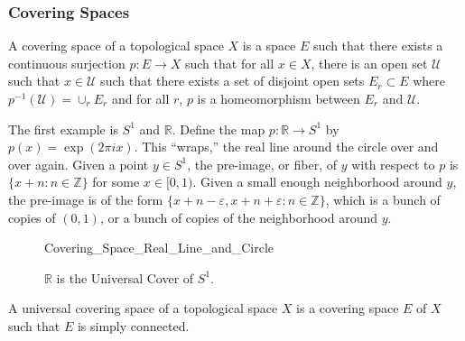 \documentclass[crop=false,class=book,oneside]{standalone}                      %
\begin{document}
        \subsubsection{Covering Spaces}
            \begin{definition}
                A covering space of a
                topological space $X$
                is a space
                $E$ such that there exists
                a continuous surjection
                $p:E\rightarrow{X}$ such that
                for all $x\in{X}$, there is an
                open set $\mathcal{U}$ such that
                $x\in\mathcal{U}$ such that there
                exists a set of disjoint open sets
                $E_{r}\subset{E}$ where
                $p^{-1}(\mathcal{U})=\cup_{r}E_{r}$
                and for all $r$,
                $p$ is a homeomorphism between
                $E_{r}$ and $\mathcal{U}$.
            \end{definition}
            \begin{example}
                The first example is
                $S^{1}$ and $\mathbb{R}$.
                Define the map
                $p:\mathbb{R}\rightarrow{S^{1}}$
                by $p(x)=\exp(2\pi{i}x)$. This ``wraps,''
                the real line around the circle over and over again.
                Given a point $y\in{S^{1}}$, the pre-image, or fiber,
                of $y$ with respect to $p$ is
                $\{x+n:n\in\mathbb{Z}\}$ for some $x\in[0,1)$.
                Given a small enough neighborhood
                around $y$, the pre-image is of the form
                $\{x+n-\varepsilon,x+n+\varepsilon:n\in\mathbb{Z}\}$,
                which is a bunch of copies of $(0,1)$, or a bunch
                of copies of the neighborhood around $y$.
            \end{example}
            \begin{figure}[H]
                \centering
                \captionsetup{type=figure}
                
                          {Covering_Space_Real_Line_and_Circle}
                \caption{$\mathbb{R}$ is the Universal Cover of $S^{1}$.}
                \label{fig:Surgery_Theory_Reals_Cover_Circle}
            \end{figure}
            \begin{definition}
                A universal covering space of a topological space $X$
                is a covering space $E$ of $X$ such that
                $E$ is simply connected.
            \end{definition}
\end{document}
